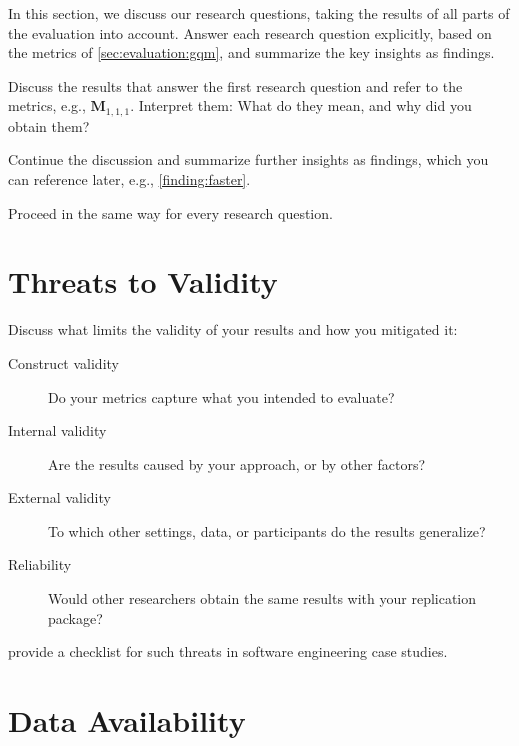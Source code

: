In this section, we discuss our research questions, taking the results of all parts of the evaluation into account.
Answer each research question explicitly, based on the metrics of \cref{sec:evaluation:gqm}, and summarize the key insights as findings.


Discuss the results that answer the first research question and refer to the metrics, e.g., $\boldsymbol{M}_{1,1,1}$.
Interpret them: What do they mean, and why did you obtain them?


Continue the discussion and summarize further insights as findings, which you can reference later, e.g., \cref{finding:faster}.


Proceed in the same way for every research question.


\section{Threats to Validity}\label{sec:evaluation:threats}

Discuss what limits the validity of your results and how you mitigated it:
\begin{description}
  \item[Construct validity] Do your metrics capture what you intended to evaluate?
  \item[Internal validity] Are the results caused by your approach, or by other factors?
  \item[External validity] To which other settings, data, or participants do the results generalize?
  \item[Reliability] Would other researchers obtain the same results with your replication package?
\end{description}
\textcite{Runeson2009} provide a checklist for such threats in software engineering case studies.

\section{Data Availability}\label{sec:evaluation:data-availability}


